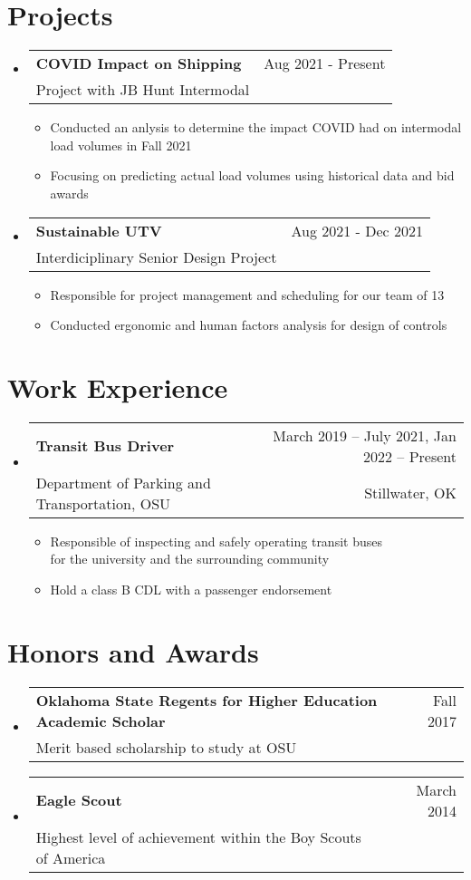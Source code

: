 \documentclass[letterpaper,12pt]{article} %
\makeatletter
\newcommand{\CVItem}[1]{
  \item\small{
    {#1 \vspace{-2pt}}
  }
}
\newcommand{\CVSubheading}[4]{
  \vspace{-2pt}\item
    \begin{tabular*}{0.97\textwidth}[t]{l@{\extracolsep{\fill}}r}
      \textbf{#1} & #2 \\
      \small#3 & \small #4 \\
    \end{tabular*}\vspace{-7pt}
}
\newcommand{\CVSubHeadingListStart}{\begin{itemize}[leftmargin=0.5cm, label={}]}
\newcommand{\CVSubHeadingListEnd}{\end{itemize}}
\newcommand{\CVItemListStart}{\begin{itemize}}
\newcommand{\CVItemListEnd}{\end{itemize}\vspace{-5pt}}
\makeatother
\begin{document}
\section{Projects}
  \CVSubHeadingListStart
    \CVSubheading
      {COVID Impact on Shipping}{Aug 2021 - Present}
      {Project with JB Hunt Intermodal}{ }
      \CVItemListStart
        \CVItem{Conducted an anlysis to determine the impact COVID had on intermodal load volumes in Fall 2021}
        \CVItem{Focusing on predicting actual load volumes using historical data and bid awards }
      \CVItemListEnd
    \CVSubheading
      {Sustainable UTV}{Aug 2021 - Dec 2021}
      {Interdiciplinary Senior Design Project}{ }
      \CVItemListStart
        \CVItem{Responsible for project management and scheduling for our team of 13}
        \CVItem{Conducted ergonomic and human factors analysis for design of controls}
      \CVItemListEnd
  \CVSubHeadingListEnd
\begin{comment}
try to briefly explain what you did and why it is relevant to the position you
are seeking
\end{comment}

\section{Work Experience}
  \CVSubHeadingListStart

    \CVSubheading
      {Transit Bus Driver}{March 2019 -- July 2021, Jan 2022 -- Present}
      {Department of Parking and Transportation, OSU}{Stillwater, OK}
      \CVItemListStart
        \CVItem{Responsible of inspecting and safely operating transit buses \\ for the university and the surrounding community}
        \CVItem{Hold a class B CDL with a passenger endorsement}
      \CVItemListEnd
  \CVSubHeadingListEnd

\section{Honors and Awards}
  \CVSubHeadingListStart
    \CVSubheading
      {Oklahoma State Regents for Higher Education Academic Scholar}{Fall 2017}
      {Merit based scholarship to study at OSU}{}
    \CVSubheading
      {Eagle Scout}{March 2014}
      {Highest level of achievement within the Boy Scouts of America}{}
  \CVSubHeadingListEnd
\end{document}
